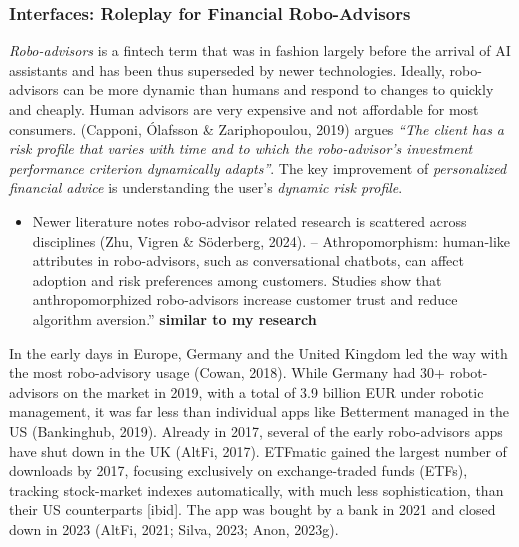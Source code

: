 \documentclass[
  letterpaper,
  DIV=11,
  numbers=noendperiod]{scrartcl}
\providecommand{\tightlist}{%
  \setlength{\itemsep}{0pt}\setlength{\parskip}{0pt}}\usepackage{longtable,booktabs,array}
\begin{document}
\subsubsection{Interfaces: Roleplay for Financial
Robo-Advisors}\label{interfaces-roleplay-for-financial-robo-advisors}

\emph{Robo-advisors} is a fintech term that was in fashion largely
before the arrival of AI assistants and has been thus superseded by
newer technologies. Ideally, robo-advisors can be more dynamic than
humans and respond to changes to quickly and cheaply. Human advisors are
very expensive and not affordable for most consumers. (Capponi, Ólafsson
\& Zariphopoulou, 2019) argues \emph{``The client has a risk profile
that varies with time and to which the robo-advisor's investment
performance criterion dynamically adapts''}. The key improvement of
\emph{personalized financial advice} is understanding the user's
\emph{dynamic risk profile}.

\begin{itemize}
\tightlist
\item
  Newer literature notes robo-advisor related research is scattered
  across disciplines (Zhu, Vigren \& Söderberg, 2024). --
  Athropomorphism: human-like attributes in robo-advisors, such as
  conversational chatbots, can affect adoption and risk preferences
  among customers. Studies show that anthropomorphized robo-advisors
  increase customer trust and reduce algorithm aversion.''
  \textbf{similar to my research}
\end{itemize}

In the early days in Europe, Germany and the United Kingdom led the way
with the most robo-advisory usage (Cowan, 2018). While Germany had 30+
robot-advisors on the market in 2019, with a total of 3.9 billion EUR
under robotic management, it was far less than individual apps like
Betterment managed in the US (Bankinghub, 2019). Already in 2017,
several of the early robo-advisors apps have shut down in the UK (AltFi,
2017). ETFmatic gained the largest number of downloads by 2017, focusing
exclusively on exchange-traded funds (ETFs), tracking stock-market
indexes automatically, with much less sophistication, than their US
counterparts {[}ibid{]}. The app was bought by a bank in 2021 and closed
down in 2023 (AltFi, 2021; Silva, 2023; Anon, 2023g).
\end{document}

